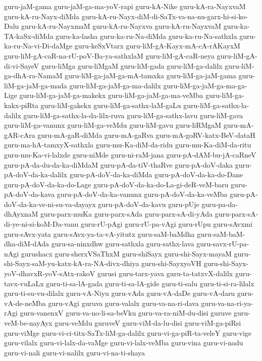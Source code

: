 {guru-jaM-gama
guru-jaM-ga-ma-yoV-rapi
guru-kA-Nike
guru-kA-ra-NayxvaM
guru-kA-ru-Nayx-diMda
guru-kA-ru-Nayx-diM-di-SaTx-va-na-nu-garx-hi-si-ko-Dalu
guru-kA-ru-NayxmaM
guru-kA-ru-Nayxva
guru-kA-ru-NayxvaM
guru-ka-TA-kaSx-diMda
guru-ka-lasha
guru-ka-ru-Na-diMda
guru-ka-ru-Na-sathxla
guru-ka-ru-Na-vi-Di-daMge
guru-keSxVtarx
guru-liM-gA-Kayx-mA-cA-rAKayxM
guru-liM-gA-caR-na-rU-poV-Ba-ya-sathxlaM
guru-liM-gA-caR-neya
guru-liM-gA-di-vi-SayeV
guru-liMga
guru-liMgaM
guru-liM-gada
guru-liM-ga-dalilx
guru-liM-ga-dhA-ra-NamaM
guru-liM-ga-jaM-ga-mA-tamxka
guru-liM-ga-jaM-gama
guru-liM-ga-jaM-ga-mada
guru-liM-ga-jaM-ga-ma-dalilx
guru-liM-ga-jaM-ga-ma-ga-Lige
guru-liM-ga-jaM-ga-makekx
guru-liM-ga-jaM-ga-ma-veMba
guru-liM-ga-kakx-piRta
guru-liM-gakekx
guru-liM-ga-sathx-laM-gaLu
guru-liM-ga-sathx-la-dalilx
guru-liM-ga-sathx-la-da-lilx-ruva
guru-liM-ga-sathx-lavu
guru-liM-gava
guru-liM-ga-vanunx
guru-liM-ga-veMdu
guru-liM-gavu
guru-liRMgaM
guru-mA-gAR-cAra
guru-mA-gaR-diMda
guru-mA-gaRva
guru-mA-goRV-katx-BeV-dataH
guru-ma-hA-tamxyX-sathxla
guru-mu-Ka-diM-da-ridu
guru-mu-Ka-diM-da-ritu
guru-mu-Ka-vi-lalxde
guru-niMde
guru-ni-raM-jana
guru-pA-dAM-bu-jA-caRneV
guru-pA-da-du-da-ka-diMdaM
guru-pA-da-tiV-thaRve
guru-pA-doV-daka
guru-pA-doV-da-ka-dalilx
guru-pA-doV-da-ka-diMda
guru-pA-doV-da-ka-do-Dane
guru-pA-doV-da-ka-do-Lage
guru-pA-doV-da-ka-do-La-gi-deR-veM-baru
guru-pA-doV-da-kava
guru-pA-doV-da-ka-vanunx
guru-pA-doV-da-ka-veMba
guru-pA-doV-da-ka-ve-ni-su-va-dayayx
guru-pA-doV-da-kavu
guru-pUje
guru-pa-da-dhAyxnaM
guru-parx-muKa
guru-parx-sAda
guru-parx-sA-di-yAda
guru-parx-sA-di-ye-ni-si-koM-Da-vanu
guru-rU-pAgi
guru-rU-pa-vAgi
guru-rUpu
guru-sAvxmi
guru-sAvx-yata
guru-sAvx-ya-ta-vA-yitutx
guru-saM-baMdha
guru-saM-baM-dha-diM-dAda
guru-sa-ninxdhw
guru-sathxla
guru-sathx-lava
guru-savx-rU-pa-nAgi
gurushacx
guru-sherxVSaThxM
guru-shiSayx
guru-shi-Sayx-mayaM
guru-shi-Sayx-saM-yu-katx-kA-ra-NA-divx-dhiya
guru-shi-SayxyoVH
guru-shi-Sayx-yoV-dhavxR-yoV-sAtx-rakoV
gurusi
guru-tarx-yava
guru-ta-tatxvX-dalilx
guru-tavx-vuLaLx
guru-ti-sa-lA-gada
guru-ti-sa-lA-gide
guru-ti-salu
guru-ti-si-ra-lilalx
guru-ti-su-vu-dilalx
guru-vA-Niyu
guru-vAda
guru-vA-daDe
guru-vA-daru
guru-vA-de-neMba
guru-vAgi
guruva
guru-valalx
guru-va-na-ri-dava
guru-va-na-ri-ya-rAgi
guru-vanenxV
guru-va-no-li-sa-beVku
guru-va-ra-niM-du-disi
guruve
guru-veM-be-nayAyx
guru-veMdu
guruveV
guru-viM-da-lu-disi
guru-viM-ga-piRsi
guru-viMge
guru-vi-ci-titx-SaTx-liM-ga-dalilx
guru-vi-ga-piR-ta-veleY
guru-vige
guru-vilalx
guru-vi-lalx-da-vaMge
guru-vi-lalx-veMba
guru-vina
guru-vi-nadu
guru-vi-nali
guru-vi-nalilx
guru-vi-na-ti-shaya
}
